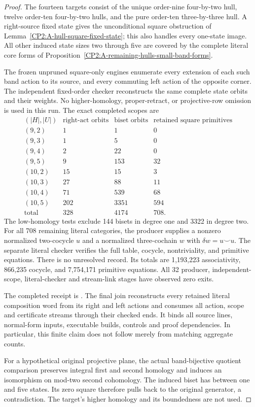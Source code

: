 \begin{proof}
The fourteen targets consist of the unique order-nine
four-by-two hull, twelve order-ten four-by-two hulls, and the
pure order-ten three-by-three hull.  A right-source fixed state
gives the unconditional square obstruction of
Lemma~\ref{CP2:A-hull-square-fixed-state}; this also handles
every one-state image.  All other induced state sizes two
through five are covered by the complete literal core forms of
Proposition~\ref{CP2:A-remaining-hulls-small-band-forms}.

The frozen unpruned square-only engines enumerate every extension
of each such band action to its source, and every commuting
left action of the opposite corner.  The independent fixed-order
checker reconstructs the same complete state orbits and their
weights.  No higher-homology, proper-retract, or projective-row
omission is used in this run.  The exact completed scopes are
\[
\begin{array}{c|r|r|r}
 (|H|,|U|)&\text{right-act orbits}&\text{biset orbits}&
 \text{retained square primitives}\\\hline
 (9,2)&1&1&0\\
 (9,3)&1&5&0\\
 (9,4)&2&22&0\\
 (9,5)&9&153&32\\
 (10,2)&15&15&3\\
 (10,3)&27&88&11\\
 (10,4)&71&539&68\\
 (10,5)&202&3351&594\\\hline
 \text{total}&328&4174&708.
\end{array}
\]
The low-homology tests exclude 144 bisets in degree one and
3322 in degree two.  For all 708 remaining literal categories,
the producer supplies a nonzero normalized two-cocycle $u$
and a normalized three-cochain $w$ with
$\delta w=u\smile u$.  The separate literal checker verifies
the full table, cocycle, nontriviality, and primitive equations.
There is no unresolved record.  Its totals are 1,193,223
associativity, 866,235 cocycle, and 7,754,171 primitive equations.
All 32 producer, independent-scope, literal-checker and stream-link
stages have observed zero exits.

The completed receipt is
.
The final join reconstructs every retained literal composition
word from its right and left actions and consumes all action,
scope and certificate streams through their checked ends.
It binds all source lines, normal-form inputs, executable builds,
controls and proof dependencies.  In particular, this finite
claim does not follow merely from matching aggregate counts.

For a hypothetical original projective plane, the actual
band-bijective quotient comparison preserves integral first
and second homology and induces an isomorphism on mod-two
second cohomology.  The induced biset has between one and five
states.  Its zero square therefore pulls back to the original
generator, a contradiction.  The target's higher homology and
its boundedness are not used.
\end{proof}

